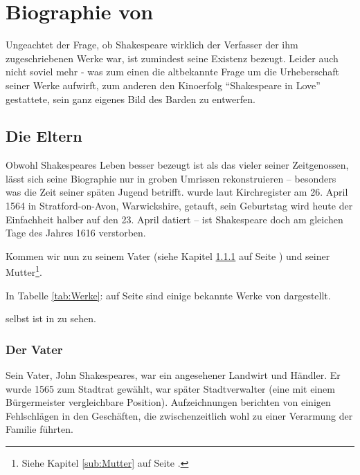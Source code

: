 \chapter{Biographie von \WS}

Ungeachtet der Frage, ob Shakespeare wirklich der Verfasser der ihm
zugeschriebenen Werke war, ist zumindest seine Existenz bezeugt. Leider auch
nicht soviel mehr - was zum einen die altbekannte Frage um die Urheberschaft
seiner Werke aufwirft, zum anderen den Kinoerfolg "`Shakespeare in Love"'
gestattete, sein ganz eigenes Bild des Barden zu entwerfen.

\section[Die Erzeuger]{Die Eltern}
\label{sec:Eltern}

Obwohl Shakespeares Leben besser bezeugt ist als das vieler seiner
Zeitgenossen, lässt sich seine Biographie nur in groben Umrissen rekonstruieren
-- besonders was die Zeit seiner späten Jugend betrifft. \WS
wurde laut Kirchregister am 26. April 1564 in Stratford-on-Avon, Warwickshire,
getauft, sein Geburtstag wird heute der Einfachheit halber auf den 23. April
datiert -- ist Shakespeare doch am gleichen Tage des Jahres 1616 verstorben.

Kommen wir nun zu seinem Vater (siehe Kapitel \ref{sub:Vater} auf Seite
\pageref{sub:Vater}) und seiner Mutter\footnote{Siehe Kapitel \ref{sub:Mutter}
auf Seite \pageref{sub:Mutter}.}.

In Tabelle \ref{tab:Werke}:  auf Seite \pageref{tab:Werke}
sind einige bekannte Werke von \WS dargestellt.

\WS{} selbst ist in  zu sehen.

\subsection{Der Vater}
\label{sub:Vater}
Sein Vater, John Shakespeares, war ein angesehener Landwirt und Händler. Er
wurde 1565 zum Stadtrat gewählt, war später Stadtverwalter (eine mit einem
Bürgermeister vergleichbare Position). Aufzeichnungen berichten von einigen
Fehlschlägen in den Geschäften, die zwischenzeitlich wohl zu einer Verarmung
der Familie führten.

